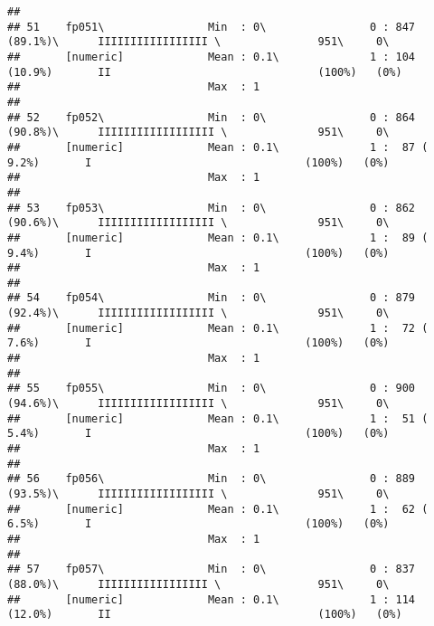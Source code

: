 \documentclass[]{article}
\begin{document}
\begin{verbatim}
## 
## 51    fp051\                Min  : 0\                0 : 847 (89.1%)\      IIIIIIIIIIIIIIIII \               951\     0\       
##       [numeric]             Mean : 0.1\              1 : 104 (10.9%)       II                                (100%)   (0%)     
##                             Max  : 1                                                                                           
## 
## 52    fp052\                Min  : 0\                0 : 864 (90.8%)\      IIIIIIIIIIIIIIIIII \              951\     0\       
##       [numeric]             Mean : 0.1\              1 :  87 ( 9.2%)       I                                 (100%)   (0%)     
##                             Max  : 1                                                                                           
## 
## 53    fp053\                Min  : 0\                0 : 862 (90.6%)\      IIIIIIIIIIIIIIIIII \              951\     0\       
##       [numeric]             Mean : 0.1\              1 :  89 ( 9.4%)       I                                 (100%)   (0%)     
##                             Max  : 1                                                                                           
## 
## 54    fp054\                Min  : 0\                0 : 879 (92.4%)\      IIIIIIIIIIIIIIIIII \              951\     0\       
##       [numeric]             Mean : 0.1\              1 :  72 ( 7.6%)       I                                 (100%)   (0%)     
##                             Max  : 1                                                                                           
## 
## 55    fp055\                Min  : 0\                0 : 900 (94.6%)\      IIIIIIIIIIIIIIIIII \              951\     0\       
##       [numeric]             Mean : 0.1\              1 :  51 ( 5.4%)       I                                 (100%)   (0%)     
##                             Max  : 1                                                                                           
## 
## 56    fp056\                Min  : 0\                0 : 889 (93.5%)\      IIIIIIIIIIIIIIIIII \              951\     0\       
##       [numeric]             Mean : 0.1\              1 :  62 ( 6.5%)       I                                 (100%)   (0%)     
##                             Max  : 1                                                                                           
## 
## 57    fp057\                Min  : 0\                0 : 837 (88.0%)\      IIIIIIIIIIIIIIIII \               951\     0\       
##       [numeric]             Mean : 0.1\              1 : 114 (12.0%)       II                                (100%)   (0%)     

\end{verbatim}
\end{document}
